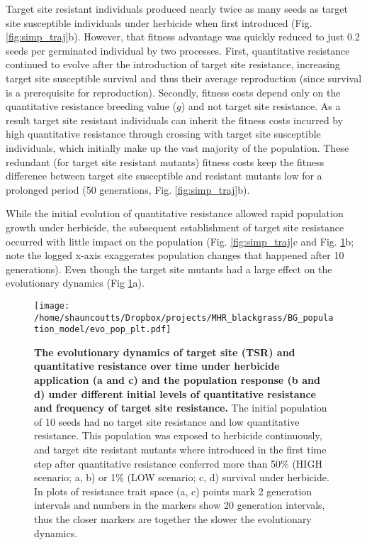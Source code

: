\documentclass[10pt,letterpaper]{article}
\begin{document}
Target site resistant individuals produced nearly twice as many seeds as target site susceptible individuals under herbicide when first introduced (Fig. \ref{fig:simp_traj}b). However, that fitness advantage was quickly reduced to just 0.2 seeds per germinated individual by two processes. First, quantitative resistance continued to evolve after the introduction of target site resistance, increasing target site susceptible survival and thus their average reproduction (since survival is a prerequisite for reproduction). Secondly, fitness costs depend only on the quantitative resistance breeding value ($g$) and not target site resistance. As a result target site resistant individuals can inherit the fitness costs incurred by high quantitative resistance through crossing with target site susceptible individuals, which initially make up the vast majority of the population. These redundant (for target site resistant mutants) fitness costs keep the fitness difference between target site susceptible and resistant mutants low for a prolonged period (50 generations, Fig. \ref{fig:simp_traj}b). 

While the initial evolution of quantitative resistance allowed rapid population growth under herbicide, the subsequent establishment of target site resistance occurred with little impact on the population (Fig. \ref{fig:simp_traj}c and Fig. \ref{fig:evo_pop}b; note the logged x-axis exaggerates population changes that happened after 10 generations). Even though the target site mutants had a large effect on the evolutionary dynamics (Fig \ref{fig:evo_pop}a). 

\begin{figure}[!h] 
	\texttt{[image: /home/shauncoutts/Dropbox/projects/MHR\_blackgrass/BG\_population\_model/evo\_pop\_plt.pdf]}
\caption{{\bf The evolutionary dynamics of target site (TSR) and quantitative resistance over time under herbicide application (a and c) and the population response (b and d) under different initial levels of quantitative resistance and frequency of target site resistance.} The initial population of 10 seeds had no target site resistance and low quantitative resistance. This population was exposed to herbicide continuously, and target site resistant mutants where introduced in the first time step after quantitative resistance conferred more than 50\% (HIGH scenario; a, b) or 1\% (LOW scenario; c, d) survival under herbicide. In plots of resistance trait space (a, c) points mark 2 generation intervals and numbers in the markers show 20 generation intervals, thus the closer markers are together the slower the evolutionary dynamics.} 
\label{fig:evo_pop}
\end{figure}
\end{document}
